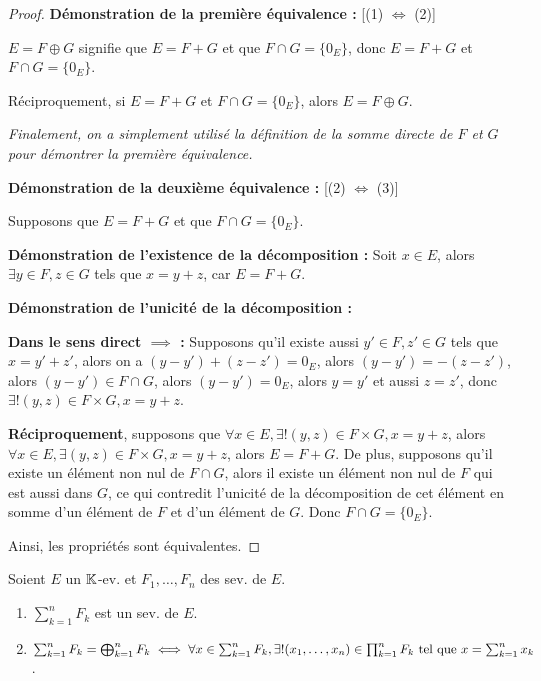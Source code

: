 \documentclass[12pt,a4paper]{report}
\begin{document}
\begin{proof}
    \textbf{Démonstration de la première équivalence :} [(1) $\iff$ (2)]

    $E = F \oplus G$ signifie que $E = F + G$ et que $F \cap G = \{0_E\}$, donc $E = F + G$ et $F \cap G = \{0_E\}$.

    Réciproquement, si $E = F + G$ et $F \cap G = \{0_E\}$, alors $E = F \oplus G$.

    \textit{Finalement, on a simplement utilisé la définition de la somme directe de $F$ et $G$ pour démontrer la première équivalence.}
    
    \textbf{Démonstration de la deuxième équivalence :} [(2) $\iff$ (3)]

    Supposons que $E = F + G$ et que $F \cap G = \{0_E\}$.

    \begin{outline}
    \1 \textbf{Démonstration de l'existence de la décomposition :} Soit $x \in E$, alors $\exists y \in F, z \in G$ tels que $x = y+z$, car $E = F + G$.

    \1 \textbf{Démonstration de l'unicité de la décomposition :}
    
    \2 \textbf{Dans le sens direct $\implies$ :} Supposons qu'il existe aussi $y' \in F, z' \in G$ tels que $x = y' + z'$, alors on a $(y-y') + (z-z') = 0_E$, alors $(y-y') = -(z-z')$, alors $(y-y') \in F\cap G$, alors $(y-y') = 0_E$, alors $y=y'$ et aussi $z=z'$, donc $\exists ! (y,z) \in F\times G, x=y+z$.

    \2 \textbf{Réciproquement}, supposons que $\forall x \in E, \exists ! (y,z) \in F\times G, x=y+z$, alors $\forall x \in E, \exists (y,z) \in F\times G, x=y+z$, alors $E=F+G$. De plus, supposons qu'il existe un élément non nul de $F\cap G$, alors il existe un élément non nul de $F$ qui est aussi dans $G$, ce qui contredit l'unicité de la décomposition de cet élément en somme d'un élément de $F$ et d'un élément de $G$. Donc $F\cap G=\{0_E\}$.
    \end{outline}

    Ainsi, les propriétés sont équivalentes.
\end{proof}

\begin{property}
    Soient $E$ un $\mathbb{K}$-ev. et $F_1,\dots,F_n$ des sev. de $E$.
    \begin{enumerate}
        \item $\sum_{k=1}^{n}F_k$ est un sev. de $E$.
        \item $\sum_{k=1}^n F_k = \bigoplus_{k=1}^n F_k \iff \forall x \in \sum_{k=1}^n F_k, \exists ! (x_1,\dots,x_n) \in \prod_{k=1}^n F_k \text{ tel que } x = \sum_{k=1}^n x_k$.
    \end{enumerate}
\end{property}
\end{document}
